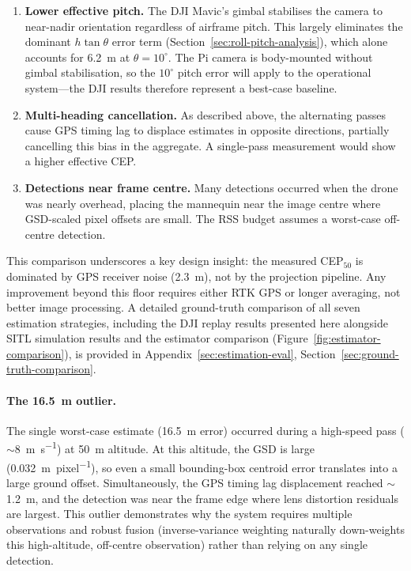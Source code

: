 \begin{enumerate}
  \item \textbf{Lower effective pitch.}  The DJI Mavic's gimbal stabilises the camera to near-nadir orientation regardless of airframe pitch.  This largely eliminates the dominant $h \tan\theta$ error term (Section~\ref{sec:roll-pitch-analysis}), which alone accounts for \SI{6.2}{\metre} at $\theta = 10^{\circ}$.  The Pi camera is body-mounted without gimbal stabilisation, so the $10^{\circ}$ pitch error will apply to the operational system---the DJI results therefore represent a best-case baseline.
  \item \textbf{Multi-heading cancellation.}  As described above, the alternating passes cause GPS timing lag to displace estimates in opposite directions, partially cancelling this bias in the aggregate.  A single-pass measurement would show a higher effective CEP.
  \item \textbf{Detections near frame centre.}  Many detections occurred when the drone was nearly overhead, placing the mannequin near the image centre where GSD-scaled pixel offsets are small.  The RSS budget assumes a worst-case off-centre detection.
\end{enumerate}

\noindent This comparison underscores a key design insight: the measured CEP$_{50}$ is dominated by GPS receiver noise (\SI{2.3}{\metre}), not by the projection pipeline.  Any improvement beyond this floor requires either RTK GPS or longer averaging, not better image processing.  A detailed ground-truth comparison of all seven estimation strategies, including the DJI replay results presented here alongside SITL simulation results and the estimator comparison (Figure~\ref{fig:estimator-comparison}), is provided in Appendix~\ref{sec:estimation-eval}, Section~\ref{sec:ground-truth-comparison}.

\paragraph{The \SI{16.5}{\metre} outlier.}
The single worst-case estimate (\SI{16.5}{\metre} error) occurred during a high-speed pass ($\sim$\SI{8}{\metre\per\second}) at \SI{50}{\metre} altitude.  At this altitude, the GSD is large (\SI{0.032}{\metre\per pixel}), so even a small bounding-box centroid error translates into a large ground offset.  Simultaneously, the GPS timing lag displacement reached $\sim$\SI{1.2}{\metre}, and the detection was near the frame edge where lens distortion residuals are largest.  This outlier demonstrates why the system requires multiple observations and robust fusion (inverse-variance weighting naturally down-weights this high-altitude, off-centre observation) rather than relying on any single detection.

